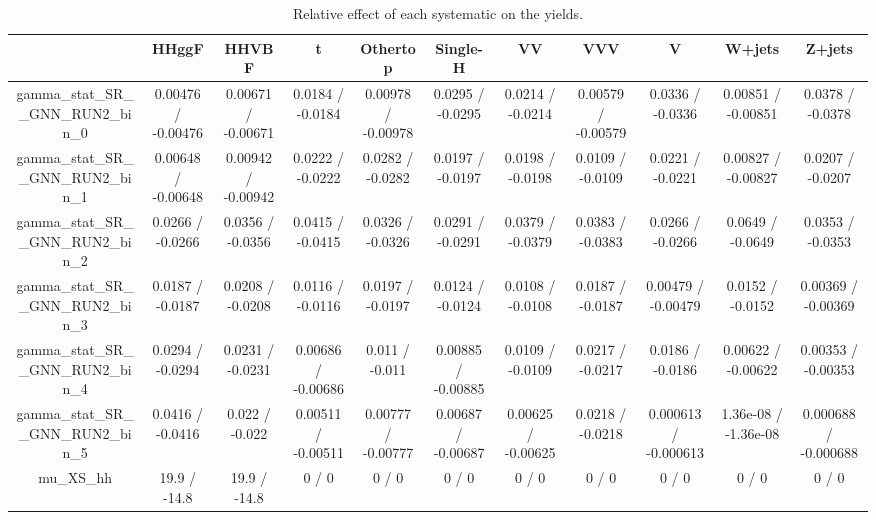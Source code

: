 \documentclass[10pt]{article}
\begin{document}
\begin{table}[htbp]
\begin{center}
\begin{tabular}{|c|c|c|c|c|c|c|c|c|c|c|}
\hline 
      & HHggF      & HHVBF      & t      & Othertop      & Single-H      & VV      & VVV      & V      & W+jets      & Z+jets \\ 
\hline 
  gamma_stat_SR__GNN_RUN2_bin_0 & 0.00476 / -0.00476 & 0.00671 / -0.00671 & 0.0184 / -0.0184 & 0.00978 / -0.00978 & 0.0295 / -0.0295 & 0.0214 / -0.0214 & 0.00579 / -0.00579 & 0.0336 / -0.0336 & 0.00851 / -0.00851 & 0.0378 / -0.0378 \\ 
  gamma_stat_SR__GNN_RUN2_bin_1 & 0.00648 / -0.00648 & 0.00942 / -0.00942 & 0.0222 / -0.0222 & 0.0282 / -0.0282 & 0.0197 / -0.0197 & 0.0198 / -0.0198 & 0.0109 / -0.0109 & 0.0221 / -0.0221 & 0.00827 / -0.00827 & 0.0207 / -0.0207 \\ 
  gamma_stat_SR__GNN_RUN2_bin_2 & 0.0266 / -0.0266 & 0.0356 / -0.0356 & 0.0415 / -0.0415 & 0.0326 / -0.0326 & 0.0291 / -0.0291 & 0.0379 / -0.0379 & 0.0383 / -0.0383 & 0.0266 / -0.0266 & 0.0649 / -0.0649 & 0.0353 / -0.0353 \\ 
  gamma_stat_SR__GNN_RUN2_bin_3 & 0.0187 / -0.0187 & 0.0208 / -0.0208 & 0.0116 / -0.0116 & 0.0197 / -0.0197 & 0.0124 / -0.0124 & 0.0108 / -0.0108 & 0.0187 / -0.0187 & 0.00479 / -0.00479 & 0.0152 / -0.0152 & 0.00369 / -0.00369 \\ 
  gamma_stat_SR__GNN_RUN2_bin_4 & 0.0294 / -0.0294 & 0.0231 / -0.0231 & 0.00686 / -0.00686 & 0.011 / -0.011 & 0.00885 / -0.00885 & 0.0109 / -0.0109 & 0.0217 / -0.0217 & 0.0186 / -0.0186 & 0.00622 / -0.00622 & 0.00353 / -0.00353 \\ 
  gamma_stat_SR__GNN_RUN2_bin_5 & 0.0416 / -0.0416 & 0.022 / -0.022 & 0.00511 / -0.00511 & 0.00777 / -0.00777 & 0.00687 / -0.00687 & 0.00625 / -0.00625 & 0.0218 / -0.0218 & 0.000613 / -0.000613 & 1.36e-08 / -1.36e-08 & 0.000688 / -0.000688 \\ 
  mu_XS_hh & 19.9 / -14.8 & 19.9 / -14.8 & 0 / 0 & 0 / 0 & 0 / 0 & 0 / 0 & 0 / 0 & 0 / 0 & 0 / 0 & 0 / 0 \\ 
\hline 
\end{tabular} 
\caption{Relative effect of each systematic on the yields.} 
\end{center} 
\end{table} 
\end{document}
